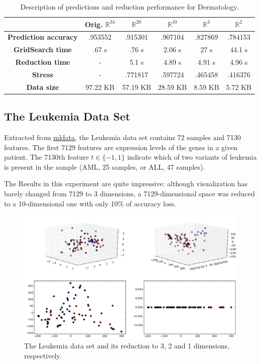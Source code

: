 \begin{table}[H]
	\centering
	\begin{tabular}{|c|c|c|c|c|c|}
		\hline
		& \textbf{Orig. $\mathbb{R}^{34}$} & \textbf{$\mathbb{R}^{20}$} & \textbf{$\mathbb{R}^{10}$} & \textbf{$\mathbb{R}^3$} & \textbf{$\mathbb{R}^2$} \\\hline
		\textbf{Prediction accuracy}  & .953552 & .915301 & .907104 & .827869 & .784153 \\\hline
		\textbf{GridSearch time} & .67 s & .76 s & 2.06 s & 27 s & 44.1 s  \\\hline
		\textbf{Reduction time}  & -         & 5.1 s & 4.89 s & 4.91 s & 4.96 s    \\\hline
		\textbf{Stress} & - & .771817 & .597724 & .465458 & .416376 \\\hline
		\textbf{Data size}          & 97.22 KB & 57.19 KB & 28.59 KB  & 8.59 KB & 5.72 KB  \\\hline
	\end{tabular}
	
	\caption{Description of predictions and reduction performance for Dermatology.}
\end{table}

\newpage
\subsection{The Leukemia Data Set}

Extracted from \href{http://mldata.com}{mldata}, the Leukemia data set contains 72 samples and 7130 features. The first 7129 features are expression levels of the genes in a given patient. The 7130th feature $t \in \{-1, 1\}$ indicate which of two variants of leukemia is present in the sample (AML, 25 samples, or ALL, 47 samples). \cite{on:duc_ds}

The Results in this experiment are quite impressive: although visualization has barely changed from 7129 to 3 dimensions, a 7129-dimensional space was reduced to a 10-dimensional one with only 10\% of accuracy loss.

\begin{figure}[H]
	\centering
	\includegraphics[width=.9\linewidth]{img/experiments/iso_leukemia}
	\captionsetup{justification=centering}
	\caption{The Leukemia data set and its reduction to 3, 2 and 1 dimensions, respectively.}
	\label{fig:leukemiads}
\end{figure}

